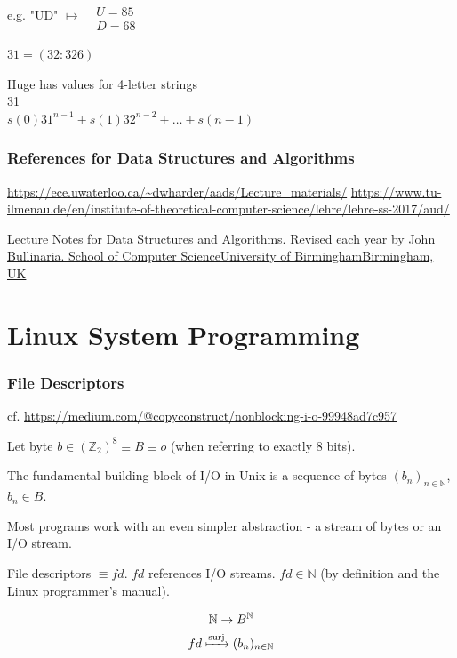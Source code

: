 \documentclass[10pt]{amsart}
\begin{document}
e.g. "UD" $\mapsto \begin{aligned} & \quad \\
	& U = 85 \\
	& D = 68 \end{aligned}$ 

$31 = (32 : 326)$ 

Huge has values for 4-letter strings \\
31 \\
$s(0) 31^{n-1} + s(1) 32^{n-2} + \dots + s(n-1)$

\section{References for Data Structures and Algorithms}

\url{https://ece.uwaterloo.ca/~dwharder/aads/Lecture_materials/}
\url{https://www.tu-ilmenau.de/en/institute-of-theoretical-computer-science/lehre/lehre-ss-2017/aud/}

\href{https://www.cs.bham.ac.uk/~jxb/DSA/dsa.pdf}{Lecture Notes for Data Structures and Algorithms. Revised each year by John Bullinaria. School of Computer ScienceUniversity of BirminghamBirmingham, UK}


\part{Linux System Programming}

\section{File Descriptors}

cf. \url{https://medium.com/@copyconstruct/nonblocking-i-o-99948ad7c957}

Let byte $b \in (\mathbb{Z}_2)^8 \equiv B \equiv o$ (when referring to exactly 8 bits).

The fundamental building block of I/O in Unix is a sequence of bytes $(b_n)_{n\in \mathbb{N}}$, $b_n \in B$. 

Most programs work with an even simpler abstraction - a stream of bytes or an I/O stream.

File descriptors $\equiv fd$. $fd$ references I/O streams.  $fd \in \mathbb{N}$ (by definition and the Linux programmer's manual).

\[
\begin{gathered}
\mathbb{N} \to B^{\mathbb{N}} \\
fd \xmapsto{\text{surj}} (b_n)_{n \in \mathbb{N}}
\end{gathered}
\]
\end{document}
